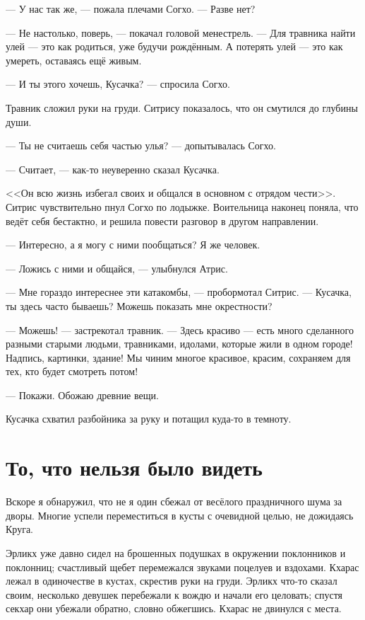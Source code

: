 --- У нас так же, --- пожала плечами Согхо.
--- Разве нет?

--- Не настолько, поверь, --- покачал головой менестрель.
--- Для травника найти улей --- это как родиться, уже будучи рождённым.
А потерять улей --- это как умереть, оставаясь ещё живым.

--- И ты этого хочешь, Кусачка? --- спросила Согхо.

Травник сложил руки на груди.
Ситрису показалось, что он смутился до глубины души.

--- Ты не считаешь себя частью улья? --- допытывалась Согхо.

--- Считает, --- как-то неуверенно сказал Кусачка.

<<Он всю жизнь избегал своих и общался в основном с отрядом чести>>.
Ситрис чувствительно пнул Согхо по лодыжке.
Воительница наконец поняла, что ведёт себя бестактно, и решила повести разговор в другом направлении.

--- Интересно, а я могу с ними пообщаться?
Я же человек.

--- Ложись с ними и общайся, --- улыбнулся Атрис.

--- Мне гораздо интереснее эти катакомбы, --- пробормотал Ситрис.
--- Кусачка, ты здесь часто бываешь?
Можешь показать мне окрестности?

--- Можешь! --- застрекотал травник.
--- Здесь красиво --- есть много сделанного разными старыми людьми, травниками, идолами, которые жили в одном городе!
Надпись, картинки, здание!
Мы чиним многое красивое, красим, сохраняем для тех, кто будет смотреть потом!

--- Покажи.
Обожаю древние вещи.

Кусачка схватил разбойника за руку и потащил куда-то в темноту.

\section{То, что нельзя было видеть}

Вскоре я обнаружил, что не я один сбежал от весёлого праздничного шума за дворы.
Многие успели переместиться в кусты с очевидной целью, не дожидаясь Круга.

Эрликх уже давно сидел на брошенных подушках в окружении поклонников и поклонниц;
счастливый щебет перемежался звуками поцелуев и вздохами.
Кхарас лежал в одиночестве в кустах, скрестив руки на груди.
Эрликх что-то сказал своим, несколько девушек перебежали к вождю и начали его целовать;
спустя секхар они убежали обратно, словно обжегшись.
Кхарас не двинулся с места.

